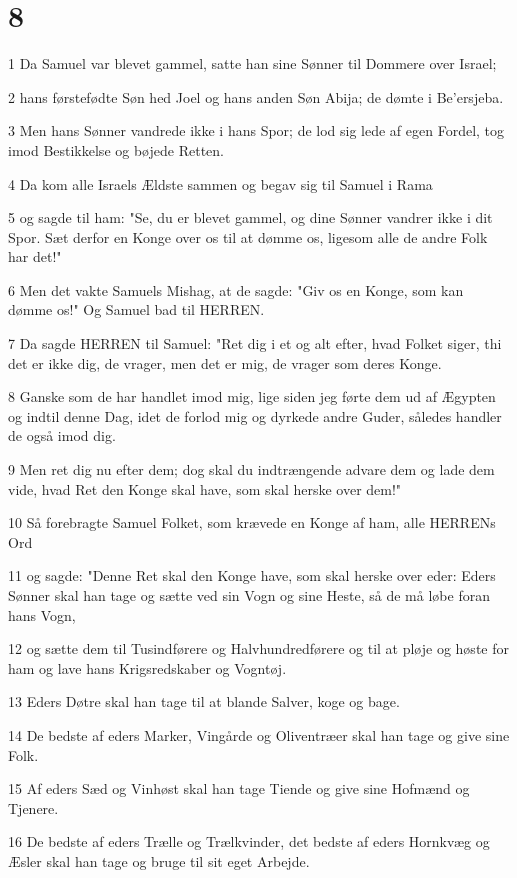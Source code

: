 \chapter{8}

\par 1 Da Samuel var blevet gammel, satte han sine Sønner til Dommere over Israel;
\par 2 hans førstefødte Søn hed Joel og hans anden Søn Abija; de dømte i Be'ersjeba.
\par 3 Men hans Sønner vandrede ikke i hans Spor; de lod sig lede af egen Fordel, tog imod Bestikkelse og bøjede Retten.
\par 4 Da kom alle Israels Ældste sammen og begav sig til Samuel i Rama
\par 5 og sagde til ham: "Se, du er blevet gammel, og dine Sønner vandrer ikke i dit Spor. Sæt derfor en Konge over os til at dømme os, ligesom alle de andre Folk har det!"
\par 6 Men det vakte Samuels Mishag, at de sagde: "Giv os en Konge, som kan dømme os!" Og Samuel bad til HERREN.
\par 7 Da sagde HERREN til Samuel: "Ret dig i et og alt efter, hvad Folket siger, thi det er ikke dig, de vrager, men det er mig, de vrager som deres Konge.
\par 8 Ganske som de har handlet imod mig, lige siden jeg førte dem ud af Ægypten og indtil denne Dag, idet de forlod mig og dyrkede andre Guder, således handler de også imod dig.
\par 9 Men ret dig nu efter dem; dog skal du indtrængende advare dem og lade dem vide, hvad Ret den Konge skal have, som skal herske over dem!"
\par 10 Så forebragte Samuel Folket, som krævede en Konge af ham, alle HERRENs Ord
\par 11 og sagde: "Denne Ret skal den Konge have, som skal herske over eder: Eders Sønner skal han tage og sætte ved sin Vogn og sine Heste, så de må løbe foran hans Vogn,
\par 12 og sætte dem til Tusindførere og Halvhundredførere og til at pløje og høste for ham og lave hans Krigsredskaber og Vogntøj.
\par 13 Eders Døtre skal han tage til at blande Salver, koge og bage.
\par 14 De bedste af eders Marker, Vingårde og Oliventræer skal han tage og give sine Folk.
\par 15 Af eders Sæd og Vinhøst skal han tage Tiende og give sine Hofmænd og Tjenere.
\par 16 De bedste af eders Trælle og Trælkvinder, det bedste af eders Hornkvæg og Æsler skal han tage og bruge til sit eget Arbejde.
